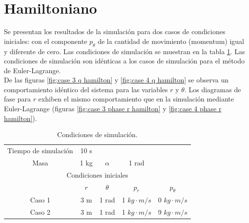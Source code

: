 \documentclass[12pt,letterpaper]{article}
\begin{document}
\pagebreak
\section*{Hamiltoniano}

Se presentan los resultados de la simulación para dos casos de condiciones iniciales: con el componente $p_\theta$ de la cantidad de movimiento (momentum) igual y diferente de cero.
Las condiciones de simulación se muestran en la
tabla \ref{table: initial conditions hamilton}.
Las condiciones de simulación son idénticas a los casos de simulación para el método de Euler-Lagrange.\\

De las figuras \ref{fig:case 3 q hamilton} y \ref{fig:case 4 q hamilton} se observa un comportamiento idéntico del sistema para las variables $r$ y $\theta$.
Los diagramas de fase para $r$ exhiben el mismo comportamiento que en la simulación mediante Euler-Lagrange (figuras \ref{fig:case 3 phase r hamilton} y \ref{fig:case 4 phase r hamilton}).


\begin{table}[h]
\begin{center}
\centering
\begin{tabular}{ccccc}
\hline
Tiempo de simulación & 10 s & & &\\
Masa & 1 kg & $\alpha$ & 1 rad  & \\
\hline
\multicolumn{5}{c}{Condiciones iniciales}\\
 & $r$ & $\theta$ & $p_r$ & $p_\theta$\\
Caso 1 & 3 m & 1 rad & 1 $kg \cdot m/s$ & 0 $kg \cdot m/s$\\
Caso 2 & 3 m & 1 rad & 1 $kg \cdot m/s$ & 9 $kg \cdot m/s$\\
\hline
\end{tabular}
\end{center}
 \caption{Condiciones de simulación.}
 \label{table: initial conditions hamilton}
\end{table}


\end{document}
